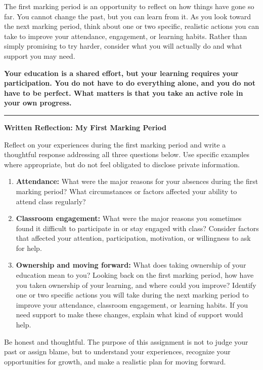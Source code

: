 \documentclass[10pt]{article}
\begin{document}
The first marking period is an opportunity to reflect on how things
have gone so far. You cannot change the past, but you can learn from
it. As you look toward the next marking period, think about one or
two specific, realistic actions you can take to improve your
attendance, engagement, or learning habits. Rather than simply
promising to try harder, consider what you will actually do and
what support you may need.

\textbf{Your education is a shared effort, but your learning requires
your participation. You do not have to do everything alone, and
you do not have to be perfect. What matters is that you take an
active role in your own progress.}

\vspace{3pt}
\hrule
\vspace{4pt}

{\large\bfseries Written Reflection: My First Marking Period}

Reflect on your experiences during the first marking period and
write a thoughtful response addressing all three questions below.
Use specific examples where appropriate, but do not feel obligated
to disclose private information.

\begin{enumerate}
    \item \textbf{Attendance:} What were the major reasons for your
    absences during the first marking period? What circumstances
    or factors affected your ability to attend class regularly?

    \item \textbf{Classroom engagement:} What were the major reasons
    you sometimes found it difficult to participate in or stay
    engaged with class? Consider factors that affected your attention,
    participation, motivation, or willingness to ask for help.

    \item \textbf{Ownership and moving forward:} What does taking
    ownership of your education mean to you? Looking back on the
    first marking period, how have you taken ownership of your
    learning, and where could you improve? Identify one or two
    specific actions you will take during the next marking period
    to improve your attendance, classroom engagement, or learning
    habits. If you need support to make these changes, explain
    what kind of support would help.
\end{enumerate}

Be honest and thoughtful. The purpose of this assignment is not
to judge your past or assign blame, but to understand your
experiences, recognize your opportunities for growth, and make
a realistic plan for moving forward.
\clearpage
\end{document}
